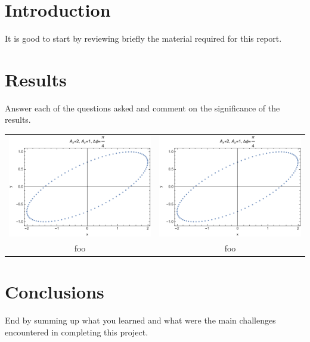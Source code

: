 \documentclass{article}
\author{\hwauthor}
\title{\hwtitle}
\date{\hwdate}
\begin{document}
\maketitle
\thispagestyle{fancy}

\section{Introduction}

It is good to start by reviewing briefly the material required for this report. 

\section{Results}

Answer each of the questions asked and comment on the significance of the results.

\bigskip
{}
\medskip

\begin{tabular}{cc}

    \includegraphics[width=3in]{homework1/plot_2,1,pi4.pdf} & \includegraphics[width=3in]{homework1/plot_2,1,pi4.pdf} \\
    foo & foo
\end{tabular}

\section{Conclusions}

End by summing up what you learned and what were the main challenges encountered in completing this project.
\end{document}
